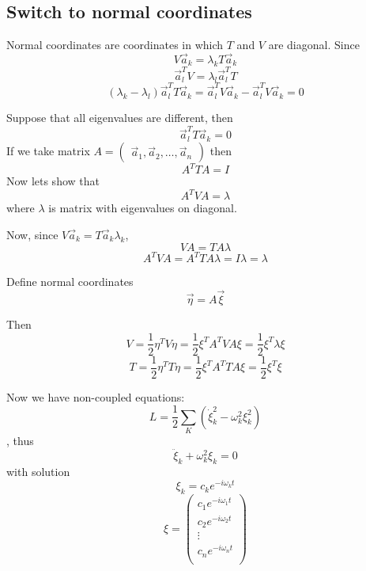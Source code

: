 \subsection{Switch to normal coordinates}
Normal coordinates are coordinates in which $T$ and $V$ are diagonal.
Since
$$V\vec{a}_k = \lambda_k T \vec{a}_k$$
$$\vec{a}_l^TV = \lambda_l \vec{a}_l^T T $$
$$(\lambda_k - \lambda_l) \vec{a}_l^T T \vec{a}_k = \vec{a}_l^TV\vec{a}_k -\vec{a}_l^TV\vec{a}_k = 0 $$

Suppose that all eigenvalues are different, then
$$\vec{a}_l^T T \vec{a}_k = 0$$
If we take matrix $A  =\begin{pmatrix} \vec{a}_1, \vec{a}_2, \dots, \vec{a}_n \end{pmatrix}$
then 
$$A^TTA=I$$
Now lets show that
$$A^TVA=\lambda$$
where $\lambda$ is matrix with eigenvalues on diagonal.

Now, since $V\vec{a}_k = T \vec{a}_k\lambda_k $,
$$VA  =TA\lambda$$
$$A^TVA  =A^TTA\lambda  =I\lambda = \lambda$$

Define normal coordinates
$$\vec{\eta} = A\vec{\xi}$$

Then
$$V = \frac{1}{2} \eta^T V \eta = \frac{1}{2} \xi^T A^T V A \xi = \frac{1}{2} \xi^T \lambda \xi$$
$$T = \frac{1}{2} \eta^T T \eta = \frac{1}{2} \xi^T A^T T A \xi = \frac{1}{2} \xi^T \xi$$

Now we have non-coupled equations:
$$L = \frac{1}{2} \sum_K \left(  \dot{\xi}_k^2 - \omega^2_k \xi^2_k \right)$$
, thus
$$\ddot{\xi}_k+ \omega_k^2 \xi_k = 0$$
with solution
$$\xi_k = c_k e^{-i\omega_k t}$$
$$\xi = \begin{pmatrix}c_1 e^{-i\omega_1 t}\\c_2 e^{-i\omega_2 t}\\\vdots \\ c_n e^{-i\omega_n t}\\\end{pmatrix}$$


